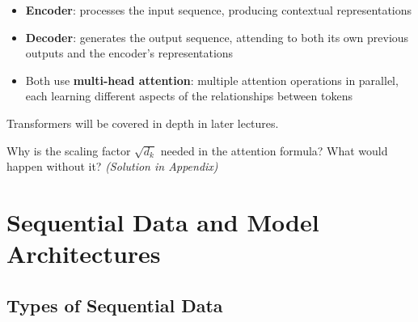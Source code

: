 \documentclass[11pt,a4paper]{article}
\begin{document}
\begin{center}
\end{center}

\begin{itemize}[leftmargin=1.5em]
    \item \textbf{Encoder}: processes the input sequence, producing contextual representations
    \item \textbf{Decoder}: generates the output sequence, attending to both its own previous outputs and the encoder's representations
    \item Both use \textbf{multi-head attention}: multiple attention operations in parallel, each learning different aspects of the relationships between tokens
\end{itemize}

Transformers will be covered in depth in later lectures.

\begin{tcolorbox}[questionbox={Self-Check Q6}]
Why is the scaling factor $\sqrt{d_k}$ needed in the attention formula? What would happen without it? \textit{(Solution in Appendix)}
\end{tcolorbox}

\section{Sequential Data and Model Architectures}

\subsection{Types of Sequential Data}
\end{document}
